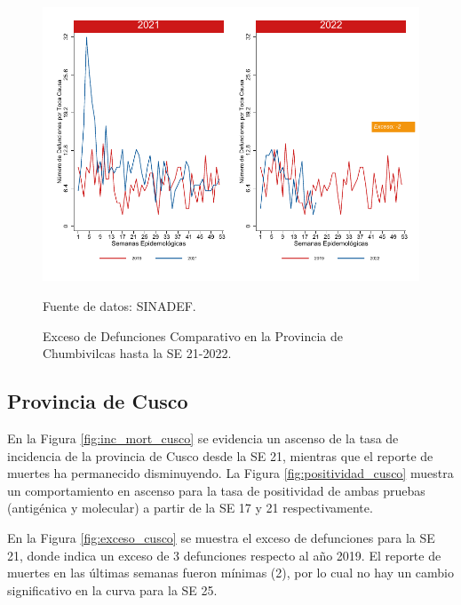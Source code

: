 \documentclass[12pt,a4paper,openany]{book}
\begin{document}
	\begin{figure}[h]
		\caption{Exceso de Defunciones Comparativo en la Provincia de Chumbivilcas hasta la SE 21-2022.}\label{fig:exceso_chumbivilcas}
		\begin{center}
			\includegraphics[width=0.7\linewidth]{../figuras/exceso_6.pdf}
		\end{center}
		{\footnotesize {Fuente de datos: SINADEF.}}
	\end{figure}
	
	\clearpage
	
	\subsection*{Provincia de Cusco}
	\noindent En la Figura \ref{fig:inc_mort_cusco} se evidencia un ascenso de la tasa de incidencia de la provincia de Cusco desde la SE 21, mientras que el reporte de muertes ha permanecido disminuyendo.   
	\noindent La  Figura \ref{fig:positividad_cusco} muestra un comportamiento en ascenso para la tasa de positividad de ambas pruebas (antigénica y molecular) a partir de la SE 17 y 21 respectivamente.
	
	En la Figura \ref{fig:exceso_cusco} se muestra el exceso de defunciones para la SE 21, donde indica un exceso de 3 defunciones respecto al año 2019. El reporte de muertes en las últimas semanas fueron mínimas (2), por lo cual no hay un cambio significativo en la curva para la SE 25. 
	
\end{document}
